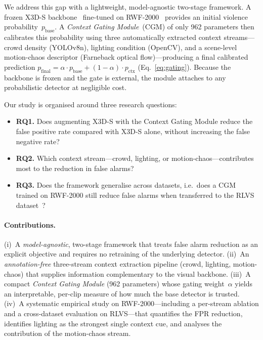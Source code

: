\documentclass[pdflatex,sn-mathphys-num]{sn-jnl}
\begin{document}
We address this gap with a lightweight, model-agnostic two-stage framework.
A frozen X3D-S backbone~\cite{fan2020x3d} fine-tuned on
RWF-2000~\cite{cheng2021rwf} provides an initial violence
probability~$p_{\text{base}}$. A \emph{Context Gating Module}~(CGM) of only
962 parameters then calibrates this probability using three automatically
extracted context streams---crowd density (YOLOv8n), lighting condition
(OpenCV), and a scene-level motion-chaos descriptor (Farneback optical
flow)---producing a final calibrated prediction
$p_{\text{final}}=\alpha\cdot p_{\text{base}}+(1-\alpha)\cdot p_{\text{ctx}}$
(Eq.~\ref{eq:gating}). Because the backbone is frozen and the gate is
external, the module attaches to any probabilistic detector at negligible
cost.

Our study is organised around three research questions:
\begin{itemize}
  \item \textbf{RQ1.} Does augmenting X3D-S with the Context Gating Module
        reduce the false positive rate compared with X3D-S alone, without
        increasing the false negative rate?
  \item \textbf{RQ2.} Which context stream---crowd, lighting, or
        motion-chaos---contributes most to the reduction in false alarms?
  \item \textbf{RQ3.} Does the framework generalise across datasets, i.e.\
        does a CGM trained on RWF-2000 still reduce false alarms when
        transferred to the RLVS dataset~\cite{soliman2019rlvs}?
\end{itemize}

\paragraph{Contributions.}
(i)~A \emph{model-agnostic}, two-stage framework that treats false alarm
reduction as an explicit objective and requires no retraining of the
underlying detector.
(ii)~An \emph{annotation-free} three-stream context extraction pipeline
(crowd, lighting, motion-chaos) that supplies information complementary to
the visual backbone.
(iii)~A compact \emph{Context Gating Module} (962 parameters) whose gating
weight~$\alpha$ yields an interpretable, per-clip measure of how much the
base detector is trusted.
(iv)~A systematic empirical study on RWF-2000---including a per-stream
ablation and a cross-dataset evaluation on RLVS---that quantifies the FPR
reduction, identifies lighting as the strongest single context cue, and
analyses the contribution of the motion-chaos stream.
\end{document}
